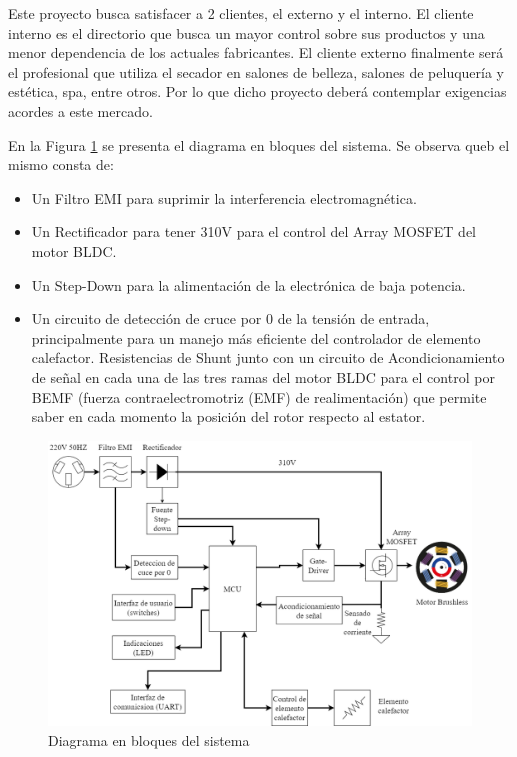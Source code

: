 \documentclass[
11pt, %
codirector, %
]{charter}
\begin{document}
Este proyecto busca satisfacer a 2 clientes, el externo y el interno.
El cliente interno es el directorio que busca un mayor control sobre sus productos y una menor dependencia de los actuales fabricantes.
El cliente externo finalmente será el profesional que utiliza el secador en salones de belleza, salones de peluquería y estética, spa, entre otros. Por lo que dicho proyecto deberá contemplar exigencias acordes a este mercado.

En la Figura \ref{fig:diagBloques} se presenta el diagrama en bloques del sistema. Se observa queb el mismo consta de:
\begin{itemize}
	\item Un Filtro EMI para suprimir la interferencia electromagnética.
	\item Un Rectificador para tener 310V para el control del Array MOSFET del motor BLDC.
	\item Un Step-Down para la alimentación de la electrónica de baja potencia.
	\item Un circuito de detección de cruce por 0 de la tensión de entrada, principalmente para un manejo más eficiente del controlador de elemento calefactor.
	      Resistencias de Shunt junto con un circuito de Acondicionamiento de señal en cada una de las tres ramas del motor BLDC para el control por BEMF (fuerza contraelectromotriz (EMF) de realimentación) que permite saber en cada momento la posición del rotor respecto al estator.
\end{itemize}


\begin{figure}[htpb]
	\centering
	\includegraphics[width=1\textwidth]{./Figuras/Diagrama_general_v1.drawio.png}
	\caption{Diagrama en bloques del sistema}
	\label{fig:diagBloques}
\end{figure}
\end{document}
